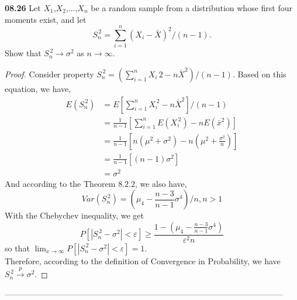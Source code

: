 {\bf 08.26}
  Let $X_1$,$X_2$,...,$X_n$ be a random sample from a distribution whose first four moments exist, and let 
  $$
    S_n^{\,2}=\sum_{i=1}^n(X_i-\bar{X})^2/(n-1).
  $$ 
  Show that $ S_n^{\,2}\to \sigma^2$ as $n\to \infty$.

\begin{proof}[Proof]
   Consider property $ S_n^{\,2}=(\sum_{i=1}^n X_i{\,2}-n\bar{X}^2)/(n-1).$ Based on this equation, we have,
    \begin{align*}
     E(S_n^{\,2})&=E[\sum_{i=1}^n X_i^{\,2}-n\bar{X}^2]/(n-1)\\
                &=\frac{1}{n-1}[\sum_{i=1}^nE(X_i^{\,2})-nE(\bar{x}^2)]\\
                &=\frac{1}{n-1}[n(\mu^2+\sigma^2)-n(\mu^2+\frac{\sigma^2}{n})]\\
                &=\frac{1}{n-1}[(n-1)\sigma^2]\\
                &=\sigma^2
     \end{align*}
   And according to the Theorem $8.2.2$, we also have,
   $$ 
   Var(S_n^{\,2})=(\mu_4-\frac{n-3}{n-1}\sigma^4)/n, n>1
   $$
   With the Chebychev inequality, we get
    $$ 
    P[|S_n^{\,2}-\sigma^2|<\varepsilon]\geq\frac{1-(\mu_4-\frac{n-3}{n-1}\sigma^4)}{\varepsilon^2n}
    $$
    so that $\lim_{x \to \infty}P[|S_n^{\,2}-\sigma^2|<\varepsilon]=1.$\\
Therefore, according to the definition of Convergence in Probability, we have $S_n^{\,2}\overset{p}{\to}\sigma^2.$
    
\end{proof}------------------------------------------------------------------------------------------------------ 